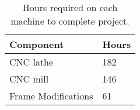 \begin{table}[h]
\centering
\caption[Summary of work hours]{Hours required on each machine to complete project.}
\begin{tabular}{| ll |} \hline
Component & Hours \\ \hline
CNC lathe & 182 \\
CNC mill & 146 \\
Frame Modifications & 61 \\ \hline
\end{tabular}
\label{tab:workhours}
\end{table}

